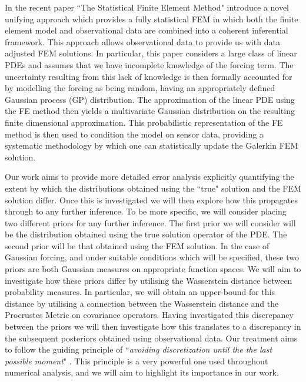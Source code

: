 In the recent paper ``The Statistical Finite Element Method" \textcolor{blue}{\citeauthor{girolami2019statistical}} introduce a novel unifying approach which provides a fully statistical FEM in which both the finite element model and observational data are combined into a coherent inferential framework. This approach allows observational data to provide us with data adjusted FEM solutions. In particular, this paper considers a large class of linear PDEs and assumes that we have incomplete knowledge of the forcing term. The uncertainty resulting from this lack of knowledge is then formally accounted for by modelling the forcing as being random, having an appropriately defined Gaussian process (GP) distribution. The approximation of the linear PDE using the FE method then yields a multivariate Gaussian distribution on the resulting finite dimensional approximation. This probabilistic representation of the FE method is then used to condition the model on sensor data, providing a systematic methodology by which one can statistically update the Galerkin FEM solution.

Our work aims to provide more detailed error analysis explicitly quantifying the extent by which the distributions obtained using the ``true" solution and the FEM solution differ. Once this is investigated we will then explore how this propagates through to any further inference. To be more specific, we will consider placing two different priors for any further inference. The first prior we will consider will be the distribution obtained using the true solution operator of the PDE. The second prior will be that obtained using the FEM solution. In the case of Gaussian forcing, and under suitable conditions which will be specified, these two priors are both Gaussian measures on appropriate function spaces. We will aim to investigate how these priors differ by utilising the Wasserstein distance between probability measures. In particular, we will obtain an upper-bound for this distance by utilising a connection between the Wasserstein distance and the Procrustes Metric on covariance operators. Having investigated this discrepancy between the priors we will then investigate how this translates to a discrepancy in the subsequent posteriors obtained using observational data. Our treatment aims to follow the guiding principle of ``\textit{avoiding discretization until the the last possible moment}" \textcolor{blue}{\cite{stuart2010inverse}}. This principle is a very powerful one used throughout numerical analysis, and we will aim to highlight its importance in our work.

